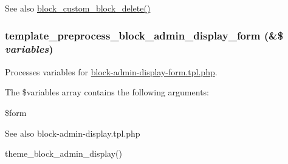 \begin{DoxySeeAlso}{See also}
\hyperlink{block_8admin_8inc_a4a3fd0e8a27350b661073c26ced2912d}{block\_\-custom\_\-block\_\-delete()} 
\end{DoxySeeAlso}
\hypertarget{block_8admin_8inc_a790da1d1c8cea6bceca5374a4e410c01}{
\subsubsection[{template\_\-preprocess\_\-block\_\-admin\_\-display\_\-form}]{\setlength{\rightskip}{0pt plus 5cm}template\_\-preprocess\_\-block\_\-admin\_\-display\_\-form (\&\$ {\em variables})}}
\label{block_8admin_8inc_a790da1d1c8cea6bceca5374a4e410c01}
Processes variables for \hyperlink{block-admin-display-form_8tpl_8php}{block-\/admin-\/display-\/form.tpl.php}.

The \$variables array contains the following arguments:
\begin{DoxyItemize}
\item \$form
\end{DoxyItemize}

\begin{DoxySeeAlso}{See also}
block-\/admin-\/display.tpl.php 

theme\_\-block\_\-admin\_\-display() 
\end{DoxySeeAlso}

